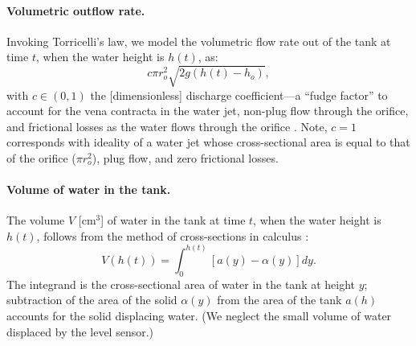 \documentclass[openacc]{rsproca_new}%
\begin{document}
\paragraph{Volumetric outflow rate.}
Invoking Torricelli's law, we model the volumetric flow rate out of the tank at time $t$, when the water height is $h(t)$, as:
\begin{equation}
	c \pi r_o^2 \sqrt{2 g(h(t)-h_o)}, \label{eq:outletflow}
\end{equation}
with $c\in(0,1)$ the [dimensionless] discharge coefficient---a ``fudge factor'' to account for the vena contracta in the water jet, non-plug flow through the orifice, and frictional losses as the water flows through the orifice \cite{horsch2020simple,teoman2022discharge,hicks2014determining,blasone2015discharge,lienhard1984velocity,wadhwa2021study}. 
Note, $c=1$ corresponds with ideality of a water jet whose cross-sectional area is equal to that of the orifice ($\pi r_o^2$), plug flow, and zero frictional losses.

\paragraph{Volume of water in the tank.} 
The volume $V$ [cm$^3$] of water in the tank at time $t$, when the water height is $h(t)$, follows from the method of cross-sections in calculus \cite{debook}:
\begin{equation}
	V(h(t))=\int_0^{h(t)} \left[a(y) - \alpha(y) \right] dy. \label{eq:volume}
\end{equation}
The integrand is the cross-sectional area of water in the tank at height $y$; subtraction of the area of the solid $\alpha(y)$ from the area of the tank $a(h)$ accounts for the solid displacing water. (We neglect the small volume of water displaced by the level sensor.)
\end{document}
